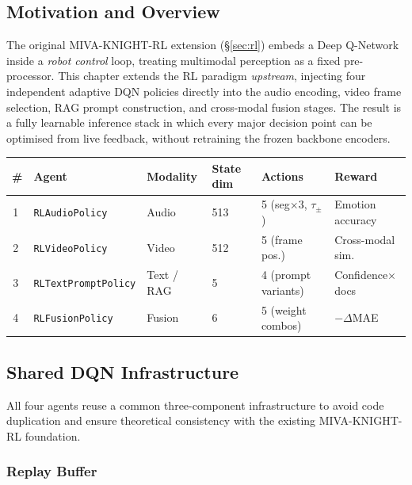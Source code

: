 \documentclass[12pt,a4paper]{article}
\theoremstyle{definition}
\theoremstyle{plain}
\theoremstyle{remark}
\begin{document}
\subsection{Motivation and Overview}

The original MIVA-KNIGHT-RL extension (\S\ref{sec:rl}) embeds a Deep Q-Network
inside a \emph{robot control} loop, treating multimodal perception as a fixed
pre-processor.  This chapter extends the RL paradigm \emph{upstream}, injecting
four independent adaptive DQN policies directly into the audio encoding, video
frame selection, RAG prompt construction, and cross-modal fusion stages.  The
result is a fully learnable inference stack in which every major decision point
can be optimised from live feedback, without retraining the frozen backbone
encoders.

\begin{tcolorbox}[keybox,title={Four RL Injection Points --- Summary}]
\begin{tabular}{clllll}
\toprule
\textbf{\#} & \textbf{Agent} & \textbf{Modality} & \textbf{State dim} & \textbf{Actions} & \textbf{Reward} \\
\midrule
\textcircled{1} & \texttt{RLAudioPolicy}  & Audio          & 513 & 5 (seg$\times$3, $\tau_{\pm}$) & Emotion accuracy \\
\textcircled{2} & \texttt{RLVideoPolicy}  & Video          & 512 & 5 (frame pos.)                 & Cross-modal sim. \\
\textcircled{3} & \texttt{RLTextPromptPolicy} & Text / RAG & 5   & 4 (prompt variants)            & Confidence$\times$docs \\
\textcircled{4} & \texttt{RLFusionPolicy} & Fusion         & 6   & 5 (weight combos)              & $-\Delta$MAE \\
\bottomrule
\end{tabular}
\end{tcolorbox}

\subsection{Shared DQN Infrastructure}
\label{sec:rl_infra}

All four agents reuse a common three-component infrastructure to avoid code
duplication and ensure theoretical consistency with the existing
MIVA-KNIGHT-RL foundation.

\subsubsection{Replay Buffer}
\end{document}
